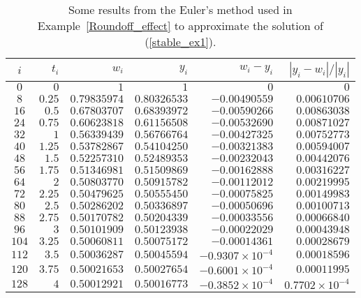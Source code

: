 \begin{egg}
\begin{table}
\begin{center}
{\small
\begin{tabular}{crrrrr}
$i$ & $t_i$ & $w_i$ & $y_i$ & $w_i-y_i$ & $|y_i-w_i|/|y_i|$ \\
\hline
$0$ & $0$ & $1$ & $1$ & $0$ & $0$ \\
$8$ & $0.25$ & $0.79835974$ & $0.80326533$ & $-0.00490559$ & $0.00610706$\\
$16$ & $0.5$ & $0.67803707$ & $0.68393972$ & $-0.00590266$ & $0.00863038$ \\
$24$ & $0.75$ & $0.60623818$ & $0.61156508$ & $-0.00532690$ & $0.00871027$ \\
$32$ & $1$ & $0.56339439$ & $0.56766764$ & $-0.00427325$ & $0.00752773$ \\
$40$ & $1.25$ & $0.53782867$ & $0.54104250$ & $-0.00321383$ & $0.00594007$ \\
$48$ & $1.5$ & $0.52257310$ & $0.52489353$ & $-0.00232043$ & $0.00442076$ \\
$56$ & $1.75$ & $0.51346981$ & $0.51509869$ & $-0.00162888$ & $0.00316227$ \\
$64$ & $2$ & $0.50803770$ & $0.50915782$ & $-0.00112012$ & $0.00219995$ \\
$72$ & $2.25$ & $0.50479625$ & $0.50555450$ & $-0.00075825$ & $0.00149983$ \\
$80$ & $2.5$ & $0.50286202$ & $0.50336897$ & $-0.00050696$ & $0.00100713$ \\
$88$ & $2.75$ & $0.50170782$ & $0.50204339$ & $-0.00033556$ & $0.00066840$ \\
$96$ & $3$ & $0.50101909$ & $0.50123938$ & $-0.00022029$ & $0.00043948$ \\
$104$ & $3.25$ & $0.50060811$ & $0.50075172$ & $-0.00014361$ & $0.00028679$ \\
$112$ & $3.5$ & $0.50036287$ & $0.50045594$ & $-0.9307\times 10^{-4}$ &
$0.00018596$ \\
$120$ & $3.75$ & $0.50021653$ & $0.50027654$ & $-0.6001 \times 10^{-4}$ &
$0.00011995$ \\
$128$ & $4$ & $0.50012921$ & $0.50016773$ & $-0.3852 \times 10^{-4}$ &
$0.7702 \times 10^{-4}$ \\
\hline
\end{tabular}
}
\end{center}
\caption[Example for the Euler's method]{Some results from
the Euler's method used in Example~\ref{Roundoff_effect} to approximate
the solution of (\ref{stable_ex1}).\label{STAB_EM}}
\end{table}


\end{egg}
